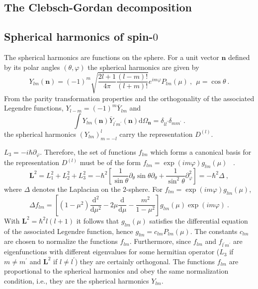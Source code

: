 \documentclass[12pt,a4paper]{article}
\renewcommand{\vec}[1]{\boldsymbol{#1}}
\newcommand{\dif}{\mathrm{d}}
\begin{document}
\subsection{The Clebsch-Gordan decomposition}
\cite{2008cmb..book.....D} 





















\subsection{Spherical harmonics of spin-$0$}
\cite{2008cmb..book.....D} The spherical harmonics are functions on the sphere. For a unit vector $\vec{n}$ defined by its polar angles $(\theta, \varphi)$ the spherical harmonics are given by
\begin{equation}
Y_{lm}(\vec{n}) = (-1)^m \sqrt{\dfrac{2l+1}{4\pi} \dfrac{(l-m)!}{(l+m)!} } e^{im\varphi} P_{lm}(\mu) ~, ~~ \mu = \cos \theta ~.
\end{equation}
From the parity transformation properties and the orthogonality of the associated Legendre functions, $Y_{l-m} = (-1)^m \bar{Y}_{lm}$ and 
\begin{equation}
\int Y_{lm}(\vec{n}) \bar{Y}_{l^\prime m^\prime}(\vec{n}) \dif \Omega_{\vec{n}} = \delta_{ll^\prime} \delta_{mm^\prime} ~.
\end{equation}
the spherical harmonics $(Y_{lm})^l_{m=-l}$ carry the representation $D^{(l)}$.

$L_3 = -i\hbar \partial_\varphi$. Therefore, the set of functions $f_{lm}$ which forms a canonical basis for the representation $D^{(l)}$ must be of the form $f_{lm} = \exp (im \varphi) g_{lm}(\mu)$ ~.
\begin{equation}
\vec{L}^2 = L_1^2+ L_2^2 +L_3^2 = -\hbar^2 \left[\dfrac{1}{\sin \theta} \partial_\theta \sin \theta \partial_\theta +\dfrac{1}{\sin^2 \theta} \partial_\varphi^2 \right] = -\hbar^2 \Delta ~,
\end{equation}
where $\Delta$ denotes the Laplacian on the $2$-sphere. For $f_{lm} = \exp (im\varphi) g_{lm}(\mu)$,
\begin{equation}
\Delta f_{lm} = \left[(1-\mu^2) \dfrac{\dif^2}{\dif \mu^2} - 2\mu \dfrac{\dif }{\dif \mu} - \dfrac{m^2}{1-\mu^2}  \right] g_{lm}(\mu) \exp (im\varphi) ~.
\end{equation}
With $\vec{L}^2 = \hbar^2 l(l + 1)$ it follows that $g_{lm} (\mu)$ satisfies the differential equation of the associated Legendre function, hence $g_{lm} = c_{lm} P_{lm} (\mu)$. The constants $c_{lm}$ are chosen to normalize the functions $f_{lm}$. Furthermore, since $f_{lm}$ and $f_{l^\prime m^\prime}$ are eigenfunctions with different eigenvalues for some hermitian operator ($L_3$ if $m \neq m^\prime$ and $\vec{L}^2$ if $l \neq l^\prime$) they are certainly orthogonal. The functions $f_{lm}$ are proportional to the spherical harmonics and obey the same normalization condition, i.e., they are the spherical harmonics $Y_{lm}$.
\end{document}
